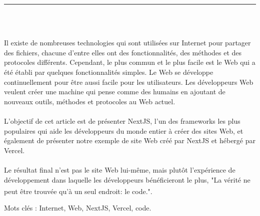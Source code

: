 \documentclass[12pt]{report}
\newenvironment{changemargin}[2]{%
\begin{list}{}{%
\setlength{\topsep}{0pt}%
\setlength{\leftmargin}{#1}%
\setlength{\rightmargin}{#2}%
\setlength{\listparindent}{\parindent}%
\setlength{\itemindent}{\parindent}%
\setlength{\parsep}{\parskip}%
}%
\item[]}{\end{list}}
\begin{document}
\begin{center}
    {\color{Blue} \rule{3in}{1.4mm} }\\
    \vspace{0.1in}
    \scshape{\fontsize{34}{46}{\bfseries{\color{Blue}{Résumé}}}}
    \\
    \vspace{0.6in}
\end{center}
\begin{changemargin}{0.9cm}{0.9cm}
\hspace*{0.16in}
Il existe de nombreuses technologies qui sont utilisées sur Internet pour partager des fichiers, chacune d’entre elles ont des fonctionnalités, des méthodes et des protocoles différents. Cependant, le plus commun et le plus facile est le Web qui a été établi par quelques fonctionnalités simples. Le Web se développe continuellement pour être aussi facile pour les utilisateurs. Les développeurs Web veulent créer une machine qui pense comme des humains en ajoutant de nouveaux outils, méthodes et protocoles au Web actuel.
\\\\
\hspace*{0.16in}
L’objectif de cet article est de présenter NextJS, l’un des frameworks les plus populaires qui aide les développeurs du monde entier à créer des sites Web, et également de présenter notre exemple de site Web créé par NextJS et hébergé par Vercel.
\\\\
\hspace*{0.16in}
Le résultat final n’est pas le site Web lui-même, mais plutôt l’expérience de développement dans laquelle les développeurs bénéficieront le plus, "La vérité ne peut être trouvée qu’à un seul endroit: le code.". \textsuperscript{\cite{martin2018clean}}
\end{changemargin}

\vspace{1in}

\begin{changemargin}{0.9cm}{0.9cm}
Mots clés : Internet, Web, NextJS, Vercel, code.
\end{changemargin}

\newpage

\vspace*{0.2in}

\thispagestyle{empty}
\end{document}
